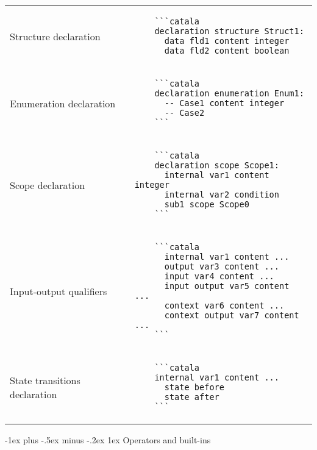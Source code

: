 \documentclass{article}
\makeatletter
\newcommand\articlenormalsize{\fontsize{10pt}{12pt}\selectfont}
\renewcommand{\section}{\@startsection{section}{1}{0mm}%
                                {-1ex plus -.5ex minus -.2ex}%
                                {1ex}%
                                {\normalfont\articlenormalsize\bfseries}}
\newenvironment{catala}{%
  \VerbatimEnvironment
  \let\FV@ListVSpace\relax
  \begin{verbatim}}%
 {\end{verbatim}}
\makeatother
\begin{document}
\begin{multicols}{3}
\begin{tabular}{@{}p{\cola}p{\colb}@{}}
  Structure declaration &
  \begin{catala}
    ```catala
    declaration structure Struct1:
      data fld1 content integer
      data fld2 content boolean
  \end{catala}
  \\
  Enumeration declaration & \begin{catala}
    ```catala
    declaration enumeration Enum1:
      -- Case1 content integer
      -- Case2
    ```
  \end{catala}
  \\
  Scope declaration & \begin{catala}
    ```catala
    declaration scope Scope1:
      internal var1 content integer
      internal var2 condition
      sub1 scope Scope0
    ```
  \end{catala}
  \\
  Input-output qualifiers & \begin{catala}
    ```catala
      internal var1 content ...
      output var3 content ...
      input var4 content ...
      input output var5 content ...
      context var6 content ...
      context output var7 content ...
    ```
  \end{catala}
  \\
  State transitions declaration & \begin{catala}
    ```catala
    internal var1 content ...
      state before
      state after
    ```
  \end{catala}
  \\
\end{tabular}

\section{Operators and built-ins}


\end{multicols}
\end{document}
